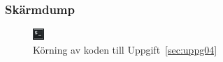 \subsubsection{Skärmdump}
\begin{figure}[htbp]
    \centering
        \includegraphics[width=\linewidth]{img/04.png}
    \caption{Körning av koden till Uppgift~\ref{sec:uppg04}}
    \label{fig:uppg04-screenshot}
\end{figure}

